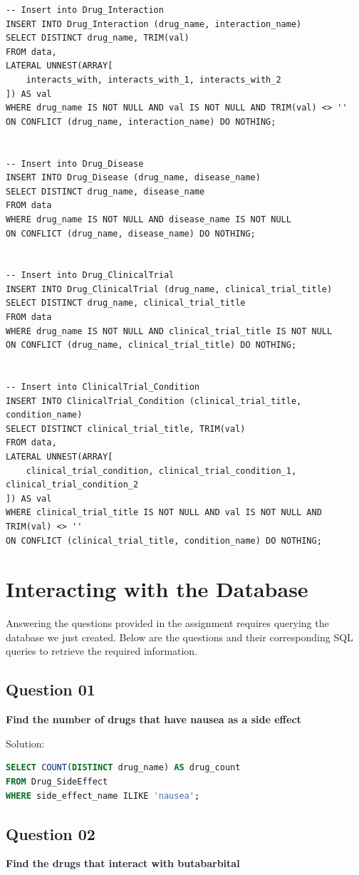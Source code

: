 \documentclass[12pt,a4paper]{article}
\begin{document}
\begin{lstlisting}[style=sqlstyle]
-- Insert into Drug_Interaction
INSERT INTO Drug_Interaction (drug_name, interaction_name)
SELECT DISTINCT drug_name, TRIM(val)
FROM data,
LATERAL UNNEST(ARRAY[
    interacts_with, interacts_with_1, interacts_with_2
]) AS val
WHERE drug_name IS NOT NULL AND val IS NOT NULL AND TRIM(val) <> ''
ON CONFLICT (drug_name, interaction_name) DO NOTHING;


-- Insert into Drug_Disease
INSERT INTO Drug_Disease (drug_name, disease_name)
SELECT DISTINCT drug_name, disease_name
FROM data
WHERE drug_name IS NOT NULL AND disease_name IS NOT NULL
ON CONFLICT (drug_name, disease_name) DO NOTHING;


-- Insert into Drug_ClinicalTrial
INSERT INTO Drug_ClinicalTrial (drug_name, clinical_trial_title)
SELECT DISTINCT drug_name, clinical_trial_title
FROM data
WHERE drug_name IS NOT NULL AND clinical_trial_title IS NOT NULL
ON CONFLICT (drug_name, clinical_trial_title) DO NOTHING;


-- Insert into ClinicalTrial_Condition
INSERT INTO ClinicalTrial_Condition (clinical_trial_title, condition_name)
SELECT DISTINCT clinical_trial_title, TRIM(val)
FROM data,
LATERAL UNNEST(ARRAY[
    clinical_trial_condition, clinical_trial_condition_1, clinical_trial_condition_2
]) AS val
WHERE clinical_trial_title IS NOT NULL AND val IS NOT NULL AND TRIM(val) <> ''
ON CONFLICT (clinical_trial_title, condition_name) DO NOTHING;
\end{lstlisting}
\newpage
\section{Interacting with the Database}

Answering the questions provided in the assignment requires querying the database we just created. Below are the questions and their corresponding SQL queries to retrieve the required information.

\subsection{Question 01}
\textbf{Find the number of drugs that have nausea as a side effect}

Solution:
\begin{lstlisting}[language=SQL]
SELECT COUNT(DISTINCT drug_name) AS drug_count
FROM Drug_SideEffect
WHERE side_effect_name ILIKE 'nausea';
\end{lstlisting}

\subsection{Question 02}
\textbf{Find the drugs that interact with butabarbital}
\end{document}

